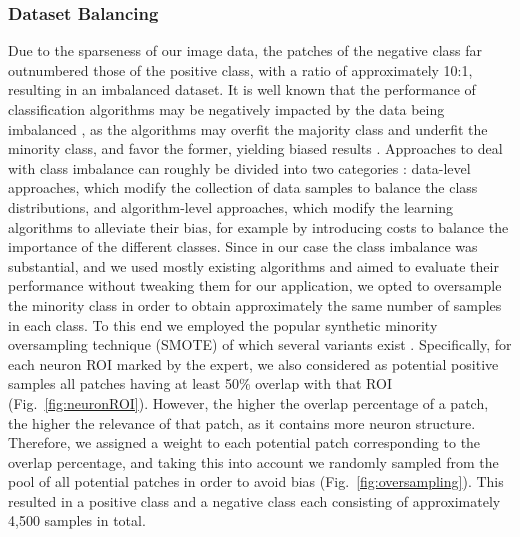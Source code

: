 \subsubsection{Dataset Balancing}
\label{sec:balanced}

Due to the sparseness of our image data, the patches of the negative class far outnumbered those of the positive class, with a ratio of approximately 10:1, resulting in an imbalanced dataset. It is well known that the performance of classification algorithms may be negatively impacted by the data being imbalanced \cite{chawla2004editorial, daskalaki2006evaluation, Forman:2010:ACS:1882471.1882479, Branco:2016:SPM:2966278.2907070}, as the algorithms may overfit the majority class and underfit the minority class, and favor the former, yielding biased results \cite{Garcia2014, Li20181}. Approaches to deal with class imbalance can roughly be divided into two categories \cite{5128907, Krawczyk-2016, Haixiang-2017}: data-level approaches, which modify the collection of data samples to balance the class distributions, and algorithm-level approaches, which modify the learning algorithms to alleviate their bias, for example by introducing costs to balance the importance of the different classes. Since in our case the class imbalance was substantial, and we used mostly existing algorithms and aimed to evaluate their performance without tweaking them for our application, we opted to oversample the minority class in order to obtain approximately the same number of samples in each class. To this end we employed the popular synthetic minority oversampling technique (SMOTE) \cite{Chawla:2002:SSM:1622407.1622416} of which several variants exist \cite{Saez2015, Krawczyk-2016, Gosain2017}. Specifically, for each neuron ROI marked by the expert, we also considered as potential positive samples all patches having at least 50\% overlap with that ROI (Fig.~\ref{fig:neuronROI}). However, the higher the overlap percentage of a patch, the higher the relevance of that patch, as it contains more neuron structure. Therefore, we assigned a weight to each potential patch corresponding to the overlap percentage, and taking this into account we randomly sampled from the pool of all potential patches in order to avoid bias (Fig.~\ref{fig:oversampling}). This resulted in a positive class and a negative class each consisting of approximately 4,500 samples in total.
